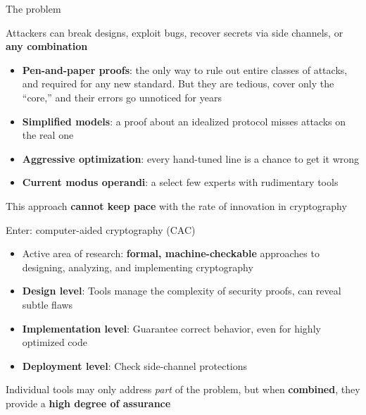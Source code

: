 \ifdefined\PRESENTATION\else\PassOptionsToClass{handout}{beamer}\fi\documentclass[aspectratio=169, lualatex]{beamer}
\begin{document}
\begin{frame}{The problem}
	\begin{center}
		\Large
		Attackers can break designs, exploit bugs, recover secrets via side channels, or \textbf{any combination}
	\end{center}
	\vspace{0.7em}
	\begin{itemize}
		\item \textbf{Pen-and-paper proofs}: the only way to rule out entire classes of attacks, and required for any new standard. But they are tedious, cover only the ``core,'' and their errors go unnoticed for years
		\item \textbf{Simplified models}: a proof about an idealized protocol misses attacks on the real one
		\item \textbf{Aggressive optimization}: every hand-tuned line is a chance to get it wrong
		\item \textbf{Current modus operandi}: a select few experts with rudimentary tools
	\end{itemize}
	\vspace{0.7em}
	\begin{center}
		This approach \textbf{cannot keep pace} with the rate of innovation in cryptography
	\end{center}
\end{frame}

\begin{frame}{Enter: computer-aided cryptography (CAC)}
	\begin{itemize}
		\item Active area of research: \textbf{formal, machine-checkable} approaches to designing, analyzing, and implementing cryptography
		\item \textbf{Design level}: Tools manage the complexity of security proofs, can reveal subtle flaws
		\item \textbf{Implementation level}: Guarantee correct behavior, even for highly optimized code
		\item \textbf{Deployment level}: Check side-channel protections
	\end{itemize}
	\vspace{1em}
	\begin{center}
		Individual tools may only address \textit{part} of the problem, but when \textbf{combined}, they provide a \textbf{high degree of assurance}
	\end{center}
\end{frame}
\end{document}
